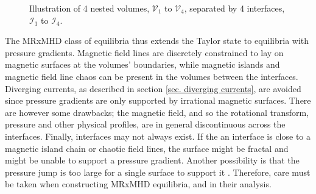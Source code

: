\documentclass[my_thesis.tex]{subfiles}
\begin{document}
\begin{figure}
	\centering
	\caption{Illustration of 4 nested volumes, $\mathcal{V}_1$ to $\mathcal{V}_4$, separated by 4 interfaces, $\mathcal{I}_1$ to $\mathcal{I}_4$.}
	\label{fig:Illustration_SPEC}
\end{figure}

The MRxMHD class of equilibria thus extends the Taylor state to equilibria with pressure gradients. Magnetic field lines are discretely constrained to lay on magnetic surfaces at the volumes' boundaries, while magnetic islands and magnetic field line chaos can be present in the volumes between the interfaces. Diverging currents, as described in section \ref{sec. diverging currents}, are avoided since pressure gradients are only supported by irrational magnetic surfaces. There are however some drawbacks; the magnetic field, and so the rotational transform, pressure and other physical profiles, are in general discontinuous across the interfaces. Finally, interfaces may not always exist. If the an interface is close to a magnetic island chain or chaotic field lines, the surface might be fractal and might be unable to support a pressure gradient. Another possibility is that the pressure jump is too large for a single surface to support it \citep{Qu2021}. Therefore, care must be taken when constructing MRxMHD equilibria, and in their analysis. 
\end{document}
